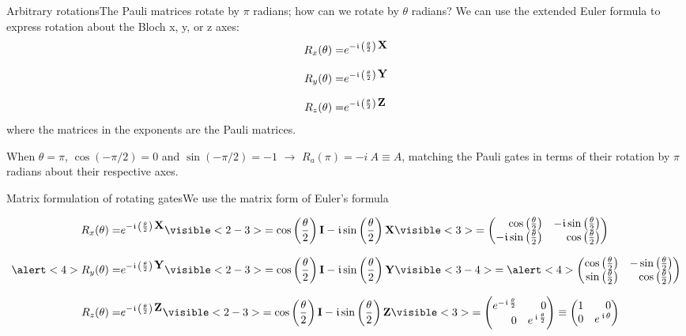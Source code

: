 \begin{frame}{Arbitrary rotations}{The Pauli matrices rotate by $\pi$ radians;  how can we rotate by $\theta$ radians?}
We can use the extended Euler formula to express rotation about the Bloch x, y, or z axes:
\begin{align*}
R_{x}(\theta) = & e^{-\kern 0.5pt\mathfrak{i}\,\left(\frac{\theta}{2}\right)\,\mbox{\bfseries{\textrm{X}}}{}}\\[0.7em]
R_{y}(\theta) = & e^{-\kern 0.5pt\mathfrak{i}\,\left(\frac{\theta}{2}\right)\,\mbox{\bfseries{\textrm{Y}}}{}}\\[0.7em]
R_{z}(\theta) = & e^{-\kern 0.5pt\mathfrak{i}\,\left(\frac{\theta}{2}\right)\,\mbox{\bfseries{\textrm{Z}}}{}}
\end{align*}
where the matrices in the exponents are the Pauli matrices.

When $\theta=\pi$, $\cos(-\pi/2)=0$ and $\sin(-\pi/2)=-1$ $\rightarrow$ $R_a(\pi) = -i\ A \equiv A$, matching the Pauli gates in terms of their rotation by $\pi$ radians about their respective axes.
\end{frame}

\def\EulerP#1{%
\ComplexDiff{\cos\left(\frac{\theta}{2}\right)\Identity}{\sin\left(\frac{\theta}{2}\right)#1}}

\begin{frame}{Matrix formulation of rotating gates}{We use the matrix form of Euler's formula}

\begin{align*}
R_{x}(\theta) = & \ExpNegPhase{\left(\frac{\theta}{2}\right)\,\PauliX{}}%
\visible<2-3>{= \EulerP{\PauliX{}}}%
\visible<3>{= \SQBG{\relax}{\cos\left(\frac{\theta}{2}\right)}{\ImaginaryM{\sin\left(\frac{\theta}{2}\right)}}{\ImaginaryM{\sin\left(\frac{\theta}{2}\right)}}{\cos\left(\frac{\theta}{2}\right)}}\\[0.7em]
%
%
\alert<4>{R_{y}(\theta)} = & \ExpNegPhase{\left(\frac{\theta}{2}\right)\,\PauliY{}}%
\visible<2-3>{= \EulerP{\PauliY{}}}
\visible<3-4>{= \alert<4>{\SQBG{\relax}{\cos\left(\frac{\theta}{2}\right)}{-\sin\left(\frac{\theta}{2}\right)}{\sin\left(\frac{\theta}{2}\right)}{\cos\left(\frac{\theta}{2}\right)}}}\\[0.7em]
%
%
R_{z}(\theta) = & \ExpNegPhase{\left(\frac{\theta}{2}\right)\,\PauliZ{}}%
\visible<2-3>{= \EulerP{\PauliZ{}}}%
\visible<3>{= \SQBG{\relax}{\ExpNegPhase{\frac{\theta}{2}}}{0}{0}{\ExpPhase{\frac{\theta}{2}}}
\equiv \SQBG{\relax}{1}{0}{0}{\ExpPhase{\theta}}}
\end{align*}
\end{frame}

